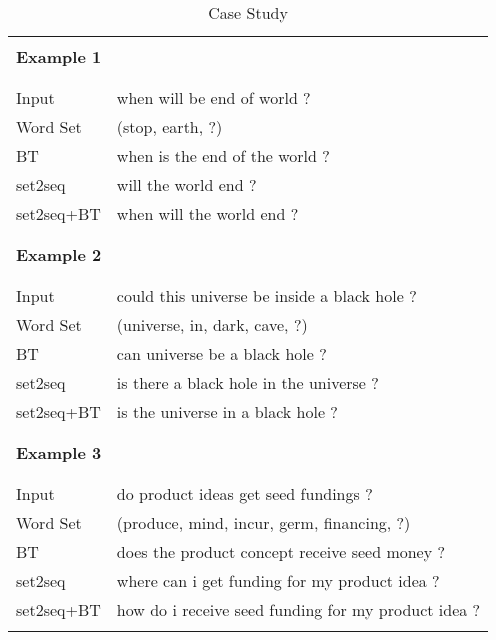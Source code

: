 \begin{table}
\small
\centering
\begin{tabular}{p{1.3cm}p{6.5cm}}
\hline 
\\ [-1.8ex]
\multicolumn{2}{l}{\textbf{Example 1}} \\
\\ [-1.8ex]
\hline
\\ [-1.8ex]
Input & when will be end of world ? \\
Word Set & (stop, earth, ?) \\
BT & when is the end of the world ? \\
set2seq & will the world end ? \\
set2seq+BT & when will the world end ? \\
\\ [-1.8ex]
\hline
\\ [-1.8ex]
\multicolumn{2}{l}{\textbf{Example 2}} \\
\\ [-1.8ex]
\hline
\\ [-1.8ex]
Input & could this universe be inside a black hole ? \\
Word Set & (universe, in, dark, cave, ?) \\
BT & can universe be a black hole ? \\
set2seq & is there a black hole in the universe ? \\
set2seq+BT & is the universe in a black hole ? \\
\\ [-1.8ex]
\hline
\\ [-1.8ex]
\multicolumn{2}{l}{\textbf{Example 3}} \\
\\ [-1.8ex]
\hline
\\ [-1.8ex]
Input & do product ideas get seed fundings ? \\
Word Set & (produce, mind, incur, germ, financing, ?) \\
BT & does the product concept receive seed money ? \\
set2seq & where can i get funding for my product idea ? \\
set2seq+BT & how do i receive seed funding for my product idea ? \\
\\ [-1.8ex]
\hline
\end{tabular}
\caption{\label{tab:case} Case Study }
\end{table}
